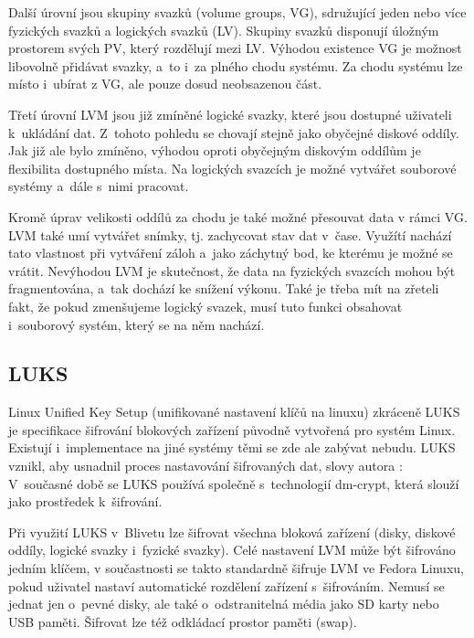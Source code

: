 \documentclass[color,table,oneside,nolot,nolof]{fithesis}
\begin{document}
	Další úrovní jsou skupiny svazků (volume groups, VG), sdružující jeden nebo více fyzických svazků a logických svazků (LV). Skupiny svazků disponují úložným prostorem svých PV, 
	který rozdělují mezi LV. Výhodou existence VG je možnost libovolně přidávat svazky, a~to i~za plného chodu systému. Za chodu systému lze místo i~ubírat z VG, ale 
	pouze dosud neobsazenou část. 

	Třetí úrovní LVM jsou již zmíněné logické svazky, které jsou dostupné uživateli k~ukládání dat. Z~tohoto pohledu se chovají stejně jako obyčejné diskové oddíly. Jak již ale
	bylo zmíněno, výhodou oproti obyčejným diskovým oddílům je flexibilita dostupného místa. Na logických svazcích je možné vytvářet souborové systémy a~dále s~nimi pracovat.

	Kromě úprav velikosti oddílů za chodu je také možné přesouvat data v rámci VG. LVM také umí vytvářet snímky, tj. zachycovat stav dat v~čase. Využítí nachází tato 
	vlastnost
	při vytváření záloh a~jako záchytný bod, ke kterému je možné se vrátit. Nevýhodou LVM je skutečnost, že data na fyzických svazcích mohou být fragmentována, a~tak
	dochází ke snížení výkonu. Také je třeba mít na zřeteli fakt, že pokud zmenšujeme logický svazek, musí tuto funkci obsahovat i~souborový systém, který se na něm nachází.

\subsection{LUKS}
	Linux Unified Key Setup (unifikované nastavení klíčů na linuxu) zkráceně LUKS je specifikace šifrování blokových zařízení původně vytvořená pro systém Linux. Existují i~implementace na jiné 
	systémy
	těmi se zde ale zabývat nebudu. LUKS vznikl, aby usnadnil proces nastavování šifrovaných dat, slovy autora : \cite{on-disk-format} V~současné době se LUKS používá společně s~technologií dm-crypt, která slouží jako prostředek k~šifrování.

	Při využití LUKS v~Blivetu lze šifrovat všechna bloková zařízení (disky, diskové oddíly, logické svazky i~fyzické svazky). Celé nastavení LVM může být šifrováno jedním klíčem, v součastnosti se takto 
	standardně šifruje LVM ve Fedora Linuxu, pokud uživatel nastaví automatické rozdělení zařízení s~šifrováním. Nemusí se jednat jen o~pevné disky, ale také o~odstranitelná média jako
	SD karty nebo USB paměti. Šifrovat lze též odkládací prostor paměti (swap).
\end{document}
